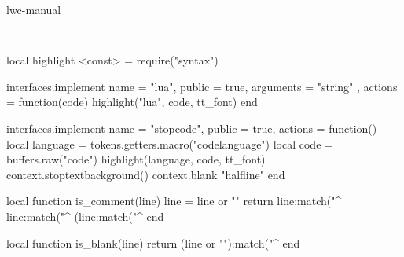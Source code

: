
\environment lwc-manual

\setuplayout[width=43em]

\begingroup
    \tt
\endgroup

\definecolor[transparent][t=0.0, a=1]
\definecolor[code][x=e6ebe6]


\def\startcode[#1]{%
    \def\codelanguage{#1}%
    \blank[halfline]%
    \starttextbackground[code]%
    \grabbufferdata[code][startcode][stopcode]%
}

\startluacode
    local highlight <const> = require("syntax")

    interfaces.implement {
        name = "lua",
        public = true,
        arguments = { "string" },
        actions = function(code)
            highlight("lua", code, tt_font)
        end
    }

    interfaces.implement {
        name = "stopcode",
        public = true,
        actions = function()
            local language = tokens.getters.macro("codelanguage")
            local code = buffers.raw("code")
            highlight(language, code, tt_font)
            context.stoptextbackground()
            context.blank { "halfline" }
        end
    }

    local function is_comment(line)
        line = line or ""
        return line:match("^%
               line:match("^%
              (line:match("^%
    end

    local function is_blank(line)
        return (line or ""):match("^%
    end

